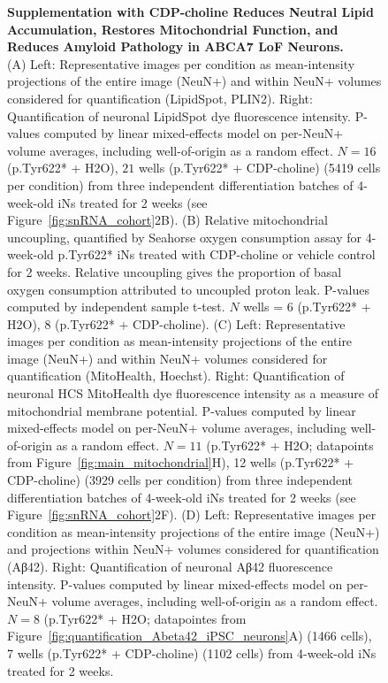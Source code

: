 \begin{figure}[ht]
    \centering
    \caption{
        \textbf{Supplementation with CDP-choline Reduces Neutral Lipid Accumulation, Restores Mitochondrial Function, and Reduces Amyloid Pathology in ABCA7 LoF Neurons.}\\[1ex]
        (A) Left: Representative images per condition as mean-intensity projections of the entire image (NeuN+) and within NeuN+ volumes considered for quantification (LipidSpot, PLIN2). Right: Quantification of neuronal LipidSpot dye fluorescence intensity. P-values computed by linear mixed-effects model on per-NeuN+ volume averages, including well-of-origin as a random effect. $N = 16$ (p.Tyr622* + H2O), $21$ wells (p.Tyr622* + CDP-choline) (5419 cells per condition) from three independent differentiation batches of 4-week-old iNs treated for 2 weeks (see Figure~\ref{fig:snRNA_cohort}2B). 
        (B) Relative mitochondrial uncoupling, quantified by Seahorse oxygen consumption assay for 4-week-old p.Tyr622* iNs treated with CDP-choline or vehicle control for 2 weeks. Relative uncoupling gives the proportion of basal oxygen consumption attributed to uncoupled proton leak. P-values computed by independent sample t-test. $N$ wells = 6 (p.Tyr622* + H2O), 8 (p.Tyr622* + CDP-choline). 
        (C) Left: Representative images per condition as mean-intensity projections of the entire image (NeuN+) and within NeuN+ volumes considered for quantification (MitoHealth, Hoechst). Right: Quantification of neuronal HCS MitoHealth dye fluorescence intensity as a measure of mitochondrial membrane potential. P-values computed by linear mixed-effects model on per-NeuN+ volume averages, including well-of-origin as a random effect. $N = 11$ (p.Tyr622* + H2O; datapoints from Figure~\ref{fig:main_mitochondrial}H), 12 wells (p.Tyr622* + CDP-choline) (3929 cells per condition) from three independent differentiation batches of 4-week-old iNs treated for 2 weeks (see Figure~\ref{fig:snRNA_cohort}2F). 
        (D) Left: Representative images per condition as mean-intensity projections of the entire image (NeuN+) and projections within NeuN+ volumes considered for quantification (Aβ42). Right: Quantification of neuronal Aβ42 fluorescence intensity. P-values computed by linear mixed-effects model on per-NeuN+ volume averages, including well-of-origin as a random effect. $N = 8$ (p.Tyr622* + H2O; datapointes from Figure~\ref{fig:quantification_Abeta42_iPSC_neurons}A) (1466 cells), 7 wells (p.Tyr622* + CDP-choline) (1102 cells) from 4-week-old iNs treated for 2 weeks. 
}
\end{figure}
